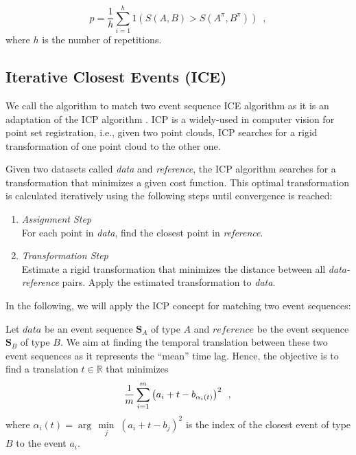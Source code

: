 \documentclass[conference]{IEEEtran}
\theoremstyle{examplestyle}
\begin{document}
\begin{equation}
	p = \dfrac{1}{h} \sum_{i = 1}^h 1 \left( S(A, B) > S(A^\pi , B^\pi) \right) \enspace, 
\end{equation}
where \(h\) is the number of repetitions.



\subsection{Iterative Closest Events (ICE)}
\label{sec:ice}

We call the algorithm to match two event sequence \acf{ICE} algorithm as it is an adaptation of the \acf{ICP} algorithm \cite{Besl1992}. \ac{ICP} is a widely-used in computer vision for point set registration, i.e., given two point clouds, \ac{ICP} searches for a rigid transformation of one point cloud to the other one. 

Given two datasets called \textit{data} and \textit{reference}, the \ac{ICP} algorithm searches for a transformation that minimizes a given cost function. This optimal transformation is calculated iteratively using the following steps \cite{Besl1992} until convergence is reached:

\begin{enumerate}
	\item \emph{Assignment Step}\\ 
	For each point in \textit{data}, find the closest point in \textit{reference}.
	\item \emph{Transformation Step}\\ Estimate a rigid transformation that minimizes the distance between all \textit{data-reference} pairs. Apply the estimated transformation to \textit{data}.
\end{enumerate}


In the following, we will apply the \ac{ICP} concept for matching two event sequences:

Let \(data\) be an event sequence \(\pmb{S}_A\) of type \(A\) and \(reference\) be the event sequence \(\pmb{S}_B\) of type \(B\). 
We aim at finding the temporal translation between these two event sequences as it represents the ``mean'' time lag.
Hence, the objective is to find a translation $t \in \mathbb{R}$ that minimizes 
\begin{equation}
 \dfrac{1}{m} \sum_{i = 1}^{m} \left( a_i + t - b_{\alpha_i(t)} \right)^2 \enspace , \\
\end{equation}
where $\alpha_i(t)= \arg\,\min\limits_j \; (a_i+t-b_j)^2$ is the index of the closest event of type $B$ to the event $a_i$.
\end{document}

